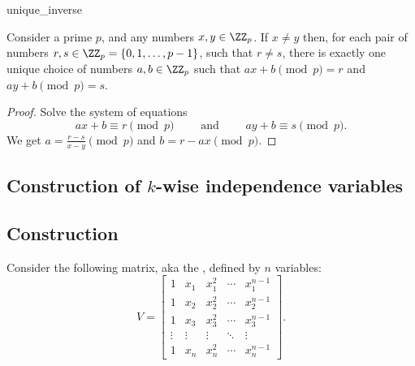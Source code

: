 \begin{fragment}{unique_inverse}
\begin{lemma}
    Consider a prime $p$, and any numbers $x, y \in \ZZ_p$.  If
    $x \neq y$ then, for each pair of numbers
    $r,s \in \ZZ_{p} = \{0,1, \ldots, p-1\}$, such that $r \neq s$,
    there is exactly one unique choice of numbers $a,b \in \ZZ_p$ such
    that $ax + b \pmod p = r$ and $ay + b \pmod p = s$.
\end{lemma}
\end{fragment}

\begin{proof}
    Solve the system of equations
    \begin{equation*}
        a x + b \equiv r \pmod p%
        \qquad%
        \text{~and~}%
        \qquad%
        a y + b \equiv s \pmod p.
    \end{equation*}
    We get $a = \frac{r-s}{x-y} \pmod p$ and $b = r - a x \pmod
    p$.
\end{proof}



\subsection{Construction of $k$-wise independence variables}

\subsection{Construction}

Consider the following matrix, aka the ,
defined by $n$ variables:
\begin{equation*}
    V=\begin{bmatrix}
      1& x_1 & x_1^2 & \cdots & x_1^{n-1}\\
      1 & x_2 & x_2^2 & \cdots & x_2^{n-1}\\
      1 & x_3 & x_3^2 & \cdots & x_3^{n-1}\\
      \vdots & \vdots & \vdots & \ddots &\vdots \\
      1 & x_n & x_n^2 & \cdots & x_n^{n-1}
    \end{bmatrix}.
\end{equation*}

\newcommand{\highlight}[1]{%
   \colorbox{red!25}{$\displaystyle#1$}}

